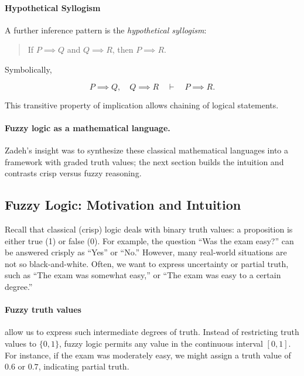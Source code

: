 \paragraph{Hypothetical Syllogism}

A further inference pattern is the \emph{hypothetical syllogism}:

\begin{quote}
If $P \implies Q$ and $Q \implies R$, then $P \implies R$.
\end{quote}

Symbolically,

\[
P \implies Q, \quad Q \implies R \quad \vdash \quad P \implies R.
\]

This transitive property of implication allows chaining of logical statements.

\paragraph{Fuzzy logic as a mathematical language.}
\label{sec:softcomp_fuzzy_logic_as_a_new_mathematical_language}
Zadeh's insight was to synthesize these classical mathematical languages into a framework with graded truth values; the next section builds the intuition and contrasts crisp versus fuzzy reasoning.


\subsection{Fuzzy Logic: Motivation and Intuition}
\label{sec:softcomp_fuzzy_logic_motivation_and_intuition}

Recall that classical (crisp) logic deals with binary truth values: a proposition is either true (1) or false (0). For example, the question ``Was the exam easy?'' can be answered crisply as ``Yes'' or ``No.'' However, many real-world situations are not so black-and-white. Often, we want to express uncertainty or partial truth, such as ``The exam was somewhat easy,'' or ``The exam was easy to a certain degree.''

\paragraph{Fuzzy truth values} allow us to express such intermediate degrees of truth. Instead of restricting truth values to \(\{0,1\}\), fuzzy logic permits any value in the continuous interval \([0,1]\). For instance, if the exam was moderately easy, we might assign a truth value of \(0.6\) or \(0.7\), indicating partial truth.

